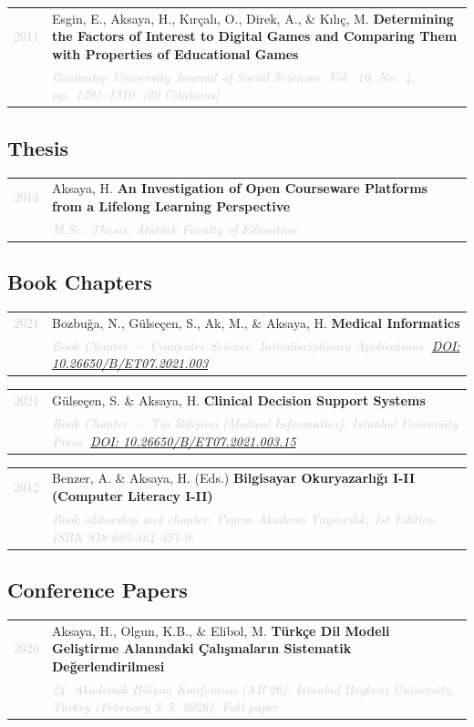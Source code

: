 \documentclass[11pt, a4paper]{article}
\makeatletter
\newcommand{\pubentry}[3]{%
  \begin{tabularx}{\textwidth}{@{}p{0.07\textwidth}X@{}}
    \textcolor{lightgray}{\small #1} & #2 \\
    & \textcolor{lightgray}{\small\itshape #3} \\
  \end{tabularx}
  \vspace{4pt}
}
\makeatother
\begin{document}
\pubentry{2011}{%
  Esgin, E., Aksaya, H., Kırçalı, O., Direk, A., \& Kılıç, M.
  \textbf{Determining the Factors of Interest to Digital Games and Comparing Them with Properties of Educational Games}}{%
  \textit{Gaziantep University Journal of Social Sciences}, Vol.\ 10, No.\ 4, pp.\ 1291--1310. \quad\textcolor{lightgray}{[20 Citations]}}

\vspace{6pt}
\subsection*{\normalsize\sffamily\color{accentblue} Thesis}
\vspace{4pt}

\pubentry{2014}{%
  Aksaya, H.
  \textbf{An Investigation of Open Courseware Platforms from a Lifelong Learning Perspective}}{%
  M.Sc.\ Thesis, Atatürk Faculty of Education.}

\vspace{6pt}
\subsection*{\normalsize\sffamily\color{accentblue} Book Chapters}
\vspace{4pt}

\pubentry{2021}{%
  Bozbuğa, N., Gülseçen, S., Ak, M., \& Aksaya, H.
  \textbf{Medical Informatics}}{%
  Book Chapter — \textit{Computer Science, Interdisciplinary Applications}. \href{https://doi.org/10.26650/B/ET07.2021.003}{DOI: 10.26650/B/ET07.2021.003}}

\pubentry{2021}{%
  Gülseçen, S. \& Aksaya, H.
  \textbf{Clinical Decision Support Systems}}{%
  Book Chapter — \textit{Tıp Bilişimi (Medical Informatics)}, Istanbul University Press. \href{https://doi.org/10.26650/B/ET07.2021.003.15}{DOI: 10.26650/B/ET07.2021.003.15}}

\pubentry{2012}{%
  Benzer, A. \& Aksaya, H. (Eds.)
  \textbf{Bilgisayar Okuryazarlığı I-II (Computer Literacy I-II)}}{%
  Book editorship and chapter. Pegem Akademi Yayıncılık, 1st Edition. ISBN 978-605-364-357-9.}

\vspace{6pt}
\subsection*{\normalsize\sffamily\color{accentblue} Conference Papers}
\vspace{4pt}

\pubentry{2026}{%
  Aksaya, H., Olgun, K.B., \& Elibol, M.
  \textbf{Türkçe Dil Modeli Geliştirme Alanındaki Çalışmaların Sistematik Değerlendirilmesi}}{%
  \textit{24. Akademik Bilişim Konferansı (AB'26)}, İstanbul Beykent University, Turkey (February 3--5, 2026). Full paper.}
\end{document}
